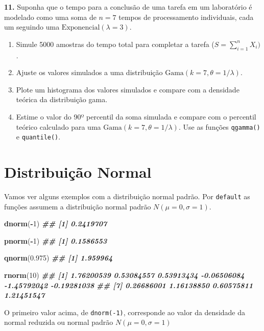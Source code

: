 \documentclass[
]{book}
\newenvironment{Shaded}{\begin{snugshade}}{\end{snugshade}}
\newcommand{\DecValTok}[1]{\textcolor[rgb]{0.00,0.00,0.81}{#1}}
\newcommand{\DocumentationTok}[1]{\textcolor[rgb]{0.56,0.35,0.01}{\textbf{\textit{#1}}}}
\newcommand{\FloatTok}[1]{\textcolor[rgb]{0.00,0.00,0.81}{#1}}
\newcommand{\FunctionTok}[1]{\textcolor[rgb]{0.13,0.29,0.53}{\textbf{#1}}}
\newcommand{\NormalTok}[1]{#1}
\newcommand{\SpecialCharTok}[1]{\textcolor[rgb]{0.81,0.36,0.00}{\textbf{#1}}}
\begin{document}
\textbf{11.} Suponha que o tempo para a conclusão de uma tarefa em um laboratório é modelado como uma soma de \(n = 7\) tempos de processamento individuais, cada um seguindo uma \(\text{Exponencial}(\lambda = 3)\).

\begin{enumerate}
\def\labelenumi{(\alph{enumi})}
\item
  Simule 5000 amostras do tempo total para completar a tarefa (\(S = \sum_{i=1}^{n} X_i)\).
\item
  Ajuste os valores simulados a uma distribuição \(\text{Gama}(k = 7, \theta = 1/\lambda)\).
\item
  Plote um histograma dos valores simulados e compare com a densidade teórica da distribuição gama.
\item
  Estime o valor do 90º percentil da soma simulada e compare com o percentil teórico calculado para uma \(\text{Gama}(k=7, \theta=1/\lambda)\). Use as funções \texttt{qgamma()} e \texttt{quantile()}.
\end{enumerate}

\section{Distribuição Normal}\label{distribuiuxe7uxe3o-normal}

Vamos ver alguns exemplos com a distribuição normal padrão. Por \texttt{default} as funções assumem a distribuição normal padrão \(N(\mu=0, \sigma = 1)\).

\begin{Shaded}
\begin{Highlighting}[]
\FunctionTok{dnorm}\NormalTok{(}\SpecialCharTok{{-}}\DecValTok{1}\NormalTok{)}
\DocumentationTok{\#\# [1] 0.2419707}

\FunctionTok{pnorm}\NormalTok{(}\SpecialCharTok{{-}}\DecValTok{1}\NormalTok{)}
\DocumentationTok{\#\# [1] 0.1586553}

\FunctionTok{qnorm}\NormalTok{(}\FloatTok{0.975}\NormalTok{)}
\DocumentationTok{\#\# [1] 1.959964}

\FunctionTok{rnorm}\NormalTok{(}\DecValTok{10}\NormalTok{)}
\DocumentationTok{\#\#  [1]  1.76200539  0.53084557  0.53913434 {-}0.06506084 {-}1.45792042 {-}0.19281038}
\DocumentationTok{\#\#  [7]  0.26686001  1.16138850  0.60575811  1.21451547}
\end{Highlighting}
\end{Shaded}

O primeiro valor acima, de \texttt{dnorm(-1)}, corresponde ao valor da densidade da normal reduzida ou normal padrão \(N(\mu=0,\sigma=1)\)
\end{document}
